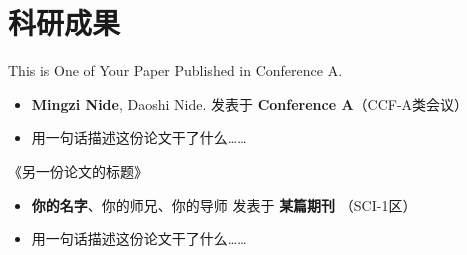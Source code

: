 \documentclass[11pt]{article} %
\newlength{\iconwidth}      %
\begin{document}
    \begin{minipage}[t]{\textwidth}
    \section[科研成果]{\makebox[\iconwidth][c]{\color{primary_color}{\faAtom}}\quad 科研成果}

    This is One of Your Paper Published in Conference A. %
    \begin{itemize}
        \item \textbf{Mingzi Nide}, Daoshi Nide. \hfill 发表于 \textbf{Conference A}（CCF-A类会议） %
        \item 用一句话描述这份论文干了什么\dots\dots %
    \end{itemize}

    \vspace{0.5em}
    《另一份论文的标题》 %
    \begin{itemize}
        \item  \textbf{你的名字}、你的师兄、你的导师 \hfill 发表于 \textbf{某篇期刊} （SCI-1区） %
        \item 用一句话描述这份论文干了什么\dots\dots %
    \end{itemize}

    \vspace{1.2em} %
    \end{minipage}
\end{document}
